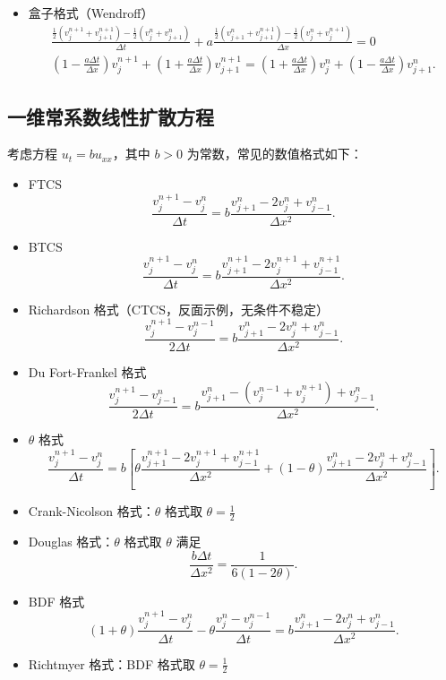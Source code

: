 \begin{itemize}
\[          \]
    \item 盒子格式（Wendroff）
          \begin{gather*}
              \frac{\frac12(v_j^{n+1} + v_{j+1}^{n+1}) - \frac12(v_j^n + v_{j+1}^n)}{\Delta t} + a \frac{\frac12(v_{j+1}^n + v_{j+1}^{n+1})-\frac12(v_j^n + v_j^{n+1})}{\Delta x} = 0 \\
              \left(1 - \frac{a \Delta t}{\Delta x}\right)v_j^{n+1} + \left(1 + \frac{a \Delta t}{\Delta x}\right)v_{j+1}^{n+1} =
              \left(1 + \frac{a \Delta t}{\Delta x}\right)v_j^{n} + \left(1 - \frac{a \Delta t}{\Delta x}\right)v_{j+1}^{n}.
          \end{gather*}
\end{itemize}


\subsection*{一维常系数线性扩散方程}

考虑方程 $u_t = b u_{xx}$，其中 $b > 0$ 为常数，常见的数值格式如下：
\begin{itemize}
    \item FTCS
          \[
              \frac{v_{j}^{n+1} - v_{j}^n}{\Delta t} = b \frac{v_{j+1}^n - 2v_{j}^n + v_{j-1}^n}{\Delta x^2}.
          \]
    \item BTCS
          \[
              \frac{v_{j}^{n+1} - v_{j}^n}{\Delta t} = b \frac{v_{j+1}^{n+1} - 2v_{j}^{n+1} + v_{j-1}^{n+1}}{\Delta x^2}.
          \]
    \item Richardson 格式（CTCS，反面示例，无条件不稳定）
          \[
              \frac{v_{j}^{n+1} - v_{j}^{n-1}}{2\Delta t} = b \frac{v_{j+1}^{n} - 2v_{j}^{n} + v_{j-1}^{n}}{\Delta x^2}.
          \]
    \item Du Fort-Frankel 格式
          \[
              \frac{v_j^{n+1}-v_{j-1}^n}{2\Delta t} = b \frac{v_{j+1}^n - (v_{j}^{n-1}+v_j^{n+1}) + v_{j-1}^n}{\Delta x^2}.
          \]
    \item $\theta$ 格式
          \[
              \frac{v_{j}^{n+1} - v_{j}^n}{\Delta t}
              =
              b \left[
                  \theta \frac{v_{j+1}^{n+1} - 2v_{j}^{n+1} + v_{j-1}^{n+1}}{\Delta x^2}
                  + (1-\theta) \frac{v_{j+1}^n - 2v_{j}^n + v_{j-1}^n}{\Delta x^2}
                  \right].
          \]
    \item Crank-Nicolson 格式：$\theta$ 格式取 $\theta = \frac12$
    \item Douglas 格式：$\theta$ 格式取 $\theta$ 满足
          \[
              \frac{b \Delta t}{\Delta x^2} = \frac{1}{6(1-2\theta)}.
          \]
    \item BDF 格式
          \[
              (1+\theta)\frac{v_{j}^{n+1} - v_{j}^{n}}{\Delta t}
              - \theta \frac{v_j^n - v_j^{n-1}}{\Delta t}
              = b \frac{v_{j+1}^{n} - 2v_{j}^{n} + v_{j-1}^{n}}{\Delta x^2}.
          \]
    \item Richtmyer 格式：BDF 格式取 $\theta = \frac12$
\end{itemize}

